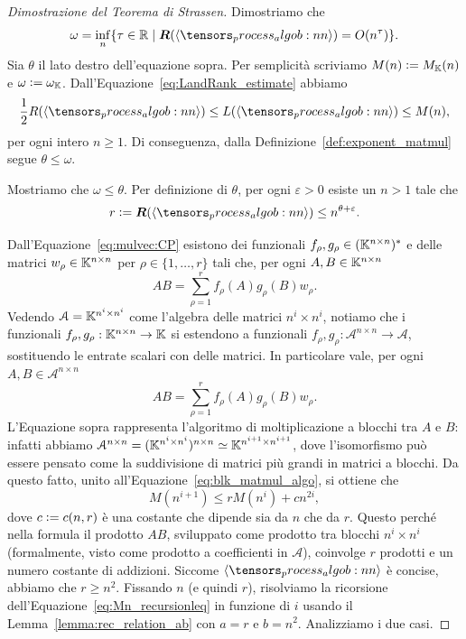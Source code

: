 \begin{proof}[Dimostrazione del Teorema di Strassen]
	Dimostriamo che
	\begin{equation*}
		\omega = \inf_{n} \{\tau \in \R \mid \rk(\algob{n}) = O(n^\tau)\}.
	\end{equation*}
	Sia $ \theta $ il lato destro dell'equazione sopra. Per semplicità scriviamo $ M(n) \vcentcolon=
		M_{\mathbb{K}}(n)$ e $ \omega \vcentcolon= \omega_{\mathbb{K}}$. Dall'Equazione~\eqref{eq:LandRank_estimate} abbiamo
	\begin{equation*}
		\frac{1}{2}R(\algob{n}) \le L(\algob{n}) \le M(n),
	\end{equation*}
	per ogni intero $ n \ge  1 $. Di conseguenza, dalla Definizione~\ref{def:exponent_matmul} segue $ \theta \le \omega $.

	Mostriamo che $ \omega \le \theta $. Per definizione di $ \theta $, per ogni $ \varepsilon >0 $
	esiste un $ n>1 $ tale che
	\begin{equation}
		\label{eq:r_estimate}
		r \defeq \rk(\algob{n}) \le n^{\theta + \varepsilon}.
	\end{equation}

	Dall'Equazione~\eqref{eq:mulvec:CP} esistono dei funzionali $ f_{\rho},g_{\rho} \in
		(\mathbb{K}^{n\times n})^*$  e delle matrici $ w_{\rho} \in \mathbb{K}^{n\times n} $ per $ \rho \in \{1, \ldots,
		r\}  $ tali che, per ogni $ A,B \in \mathbb{K}^{n\times n} $
	\begin{equation*}
		AB = \sum_{\rho = 1}^r f_{\rho}(A)g_{\rho}(B) w_{\rho}.
	\end{equation*}
	Vedendo $ \mathcal{A} = \mathbb{K}^{n^i\times n^i} $ come l'algebra delle matrici $ n^i \times n^i $, notiamo che i funzionali $ f_{\rho}, g_{\rho} : \mathbb{K}^{n\times n} \to \mathbb{K} $ si estendono a funzionali
	$ f_{\rho}, g_{\rho} : \mathcal{A}^{n\times n} \to \mathcal{A} $, sostituendo le entrate scalari
	con delle matrici. In particolare vale, per ogni $ A,B \in \mathcal{A}^{n\times n} $
	\begin{equation}
		\label{eq:blk_matmul_algo}
		AB = \sum_{\rho = 1}^r f_{\rho}(A)g_{\rho}(B) w_{\rho}.
	\end{equation}
	L'Equazione sopra rappresenta l'algoritmo di moltiplicazione a blocchi tra $ A
	$ e $ B $: infatti abbiamo $ \mathcal{A}^{n\times n} = (\mathbb{K}^{n^i\times n^i})^{n \times n} \simeq \mathbb{K}^{n^{i+1}
			\times n^{i+1}} $, dove l'isomorfismo può essere pensato come la suddivisione di matrici più
	grandi in matrici a blocchi. Da questo fatto,
	unito all'Equazione~\eqref{eq:blk_matmul_algo}, si
	ottiene che
	\begin{equation}
		\label{eq:Mn_recursionleq}
		M(n^{i+1}) \le r M(n^i) + cn^{2i},
	\end{equation}
	dove $ c \vcentcolon= c(n,r) $ è una costante che dipende sia da $ n $ che da $ r $. Questo perché nella
	formula il prodotto $ AB $, sviluppato come prodotto tra blocchi $ n^i \times n^i $ (formalmente, visto come prodotto a coefficienti in $ \mathcal{A} $), coinvolge $ r $ prodotti e
	un numero costante di addizioni.
	Siccome $ \algob{n} $ è concise, abbiamo che $ r \ge n^2 $. Fissando $ n $ (e quindi $ r $),
	risolviamo la ricorsione dell'Equazione~\eqref{eq:Mn_recursionleq} in funzione di $ i $ usando il
	Lemma~\ref{lemma:rec_relation_ab} con $ a = r $ e $ b = n^2 $. Analizziamo i due casi.


\end{proof}

